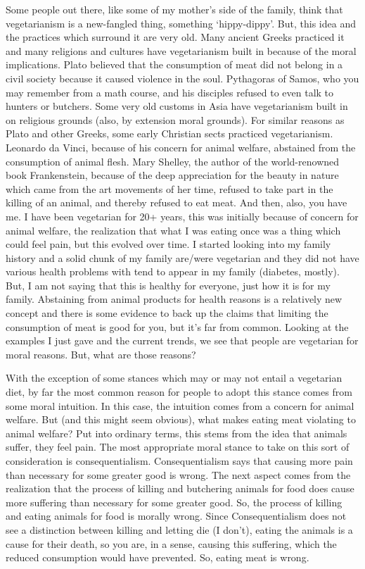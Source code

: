 Some people out there, like some of my mother's side of the family, think that vegetarianism is a new-fangled thing, something `hippy-dippy'. But, this idea and the practices which surround it are very old. Many ancient Greeks practiced it and many religions and cultures have vegetarianism built in because of the moral implications. Plato believed that the consumption of meat did not belong in a civil society because it caused violence in the soul. Pythagoras of Samos, who you may remember from a math course, and his disciples refused to even talk to hunters or butchers. Some very old customs in Asia have vegetarianism built in on religious grounds (also, by extension moral grounds). For similar reasons as Plato and other Greeks, some early Christian sects practiced vegetarianism. Leonardo da Vinci, because of his concern for animal welfare, abstained from the consumption of animal flesh. Mary Shelley, the author of the world-renowned book Frankenstein, because of the deep appreciation for the beauty in nature which came from the art movements of her time, refused to take part in the killing of an animal, and thereby refused to eat meat. And then, also, you have me. I have been vegetarian for 20+ years, this was initially because of concern for animal welfare, the realization that what I was eating once was a thing which could feel pain, but this evolved over time. I started looking into my family history and a solid chunk of my family are/were vegetarian and they did not have various health problems with tend to appear in my family (diabetes, mostly). But, I am not saying that this is healthy for everyone, just how it is for my family. Abstaining from animal products for health reasons is a relatively new concept and there is some evidence to back up the claims that limiting the consumption of meat is good for you, but it's far from common. Looking at the examples I just gave and the current trends, we see that people are vegetarian for moral reasons. But, what are those reasons?

With the exception of some stances which may or may not entail a vegetarian diet, by far the most common reason for people to adopt this stance comes from some moral intuition. In this case, the intuition comes from a concern for animal welfare. But (and this might seem obvious), what makes eating meat violating to animal welfare? Put into ordinary terms, this stems from the idea that animals suffer, they feel pain. The most appropriate moral stance to take on this sort of consideration is consequentialism. Consequentialism says that causing more pain than necessary for some greater good is wrong. The next aspect comes from the realization that the process of killing and butchering animals for food does cause more suffering than necessary for some greater good. So, the process of killing and eating animals for food is morally wrong. Since Consequentialism does not see a distinction between killing and letting die (I don't), eating the animals is a cause for their death, so you are, in a sense, causing this suffering, which the reduced consumption would have prevented. So, eating meat is wrong.  

